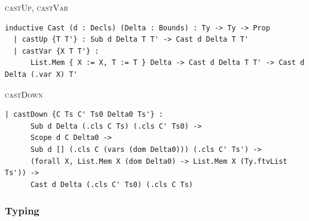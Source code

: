 \begin{cmp}{\textsc{castUp}, \textsc{castVar}}
\begin{paperside}
\qquad
{}
\end{paperside}
\begin{leanside}
\begin{lstlisting}[style=leanside]
inductive Cast (d : Decls) (Delta : Bounds) : Ty -> Ty -> Prop
  | castUp {T T'} : Sub d Delta T T' -> Cast d Delta T T'
  | castVar {X T T'} :
      List.Mem { X := X, T := T } Delta -> Cast d Delta T T' -> Cast d Delta (.var X) T'
\end{lstlisting}
\end{leanside}
\end{cmp}

\begin{cmp}{\textsc{castDown}}
\begin{paperside}
\end{paperside}
\begin{leanside}
\begin{lstlisting}[style=leanside]
  | castDown {C Ts C' Ts0 Delta0 Ts'} :
      Sub d Delta (.cls C Ts) (.cls C' Ts0) ->
      Scope d C Delta0 ->
      Sub d [] (.cls C (vars (dom Delta0))) (.cls C' Ts') ->
      (forall X, List.Mem X (dom Delta0) -> List.Mem X (Ty.ftvList Ts')) ->
      Cast d Delta (.cls C' Ts0) (.cls C Ts)
\end{lstlisting}
\end{leanside}
\end{cmp}

\subsubsection{Typing}

